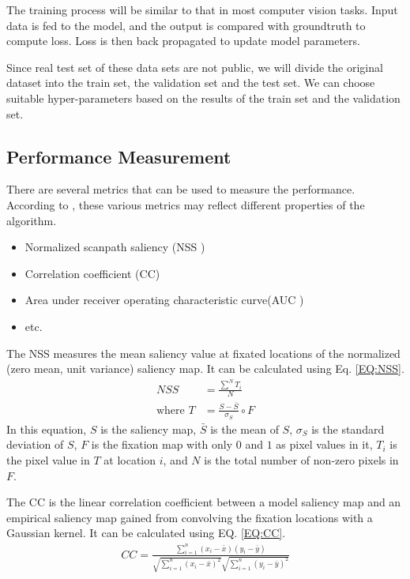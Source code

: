 \documentclass[12pt]{article}
\begin{document}
The training process will be similar to that in most computer vision tasks. Input data is fed to the model,
and the output is compared with groundtruth to compute loss. Loss is then back propagated to update model parameters.

Since real test set of these data sets are not public, we will divide the original dataset into the train set, the validation set and the test set. We can choose suitable hyper-parameters based on the results of the train set and the validation set.

\subsection{Performance Measurement}

There are several metrics that can be used to measure the performance. According to \cite{riche2013saliency}, these various metrics may reflect different properties of the algorithm.
\begin{itemize}
    \item Normalized scanpath saliency (NSS \cite{petersComponentsBottomupGaze2005})
    \item Correlation coefficient (CC)
    \item Area under receiver operating characteristic curve(AUC \cite{richeSaliencyHumanFixations2013})
    \item etc.
\end{itemize}

The NSS measures the mean saliency value at fixated locations of the normalized (zero mean, unit variance) saliency map.
It can be calculated using Eq. \ref{EQ:NSS}.
\begin{equation}
    \begin{aligned}
        NSS &= \frac{\sum^{N} T_{i}}{N}\\
        \text{where }T &= \frac{S - \bar{S}}{\sigma_{S}} \circ F
    \end{aligned}
    \label{EQ:NSS}
\end{equation}
In this equation, $S$ is the saliency map, $\bar{S}$ is the mean of $S$, $\sigma_{S}$ is
the standard deviation of $S$, $F$ is the fixation map with only $0$ and $1$ as pixel values in it,
$T_{i}$ is the pixel value in $T$ at location $i$, and $N$ is the total number of non-zero pixels in $F$.

The CC is the linear correlation coefficient between a model saliency map and an empirical saliency map
gained from convolving the fixation locations with a Gaussian kernel. It can be calculated using EQ. \ref{EQ:CC}.
\begin{equation}
    \begin{aligned}
        CC = \frac{\sum_{i=1}^{n}(x_{i}-\bar{x})(y_{i}-\bar{y})}
        {\sqrt{\sum_{i=1}^{n}(x_{i}-\bar{x})^{2}}\sqrt{\sum_{i=1}^{n}(y_{i}-\bar{y})^{2}}}
    \end{aligned}
    \label{EQ:CC}
\end{equation}
\end{document}
